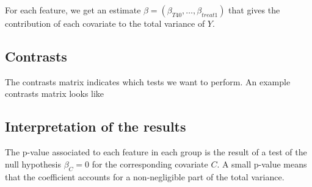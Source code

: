 \documentclass[a4paper,11pt]{article}
\begin{document}
For each feature, we get an estimate $\beta = (\beta_{T40},\ldots,\beta_{treat1})$ that gives the contribution of each covariate to the total variance of $Y$.

\subsection{Contrasts}
The contrasts matrix indicates which tests we want to perform. An example contrasts matrix looks like
$$  $$

\subsection{Interpretation of the results}
The p-value associated to each feature in each group is the result of a test of the null hypothesis $\beta_C=0$ for the corresponding covariate $C$. A small p-value means that the coefficient accounts for a non-negligible part of the total variance.
\end{document}
